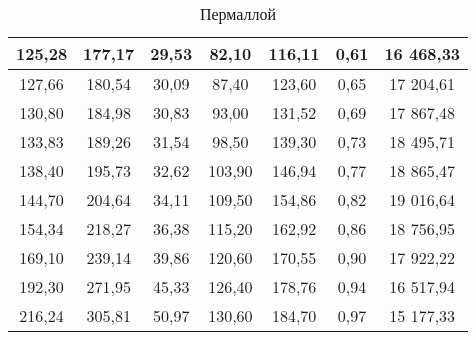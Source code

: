 \begin{table}[h!]
\begin{center}
\begin{tabular}{|c|c|c|c|c|c|c|}
            125,28               & 177,17    & 29,53     & 82,10                & 116,11   & 0,61    & 16 468,33  \\ \hline
            127,66               & 180,54    & 30,09     & 87,40                & 123,60   & 0,65    & 17 204,61  \\ \hline
            130,80               & 184,98    & 30,83     & 93,00                & 131,52   & 0,69    & 17 867,48  \\ \hline
            133,83               & 189,26    & 31,54     & 98,50                & 139,30   & 0,73    & 18 495,71  \\ \hline
            138,40               & 195,73    & 32,62     & 103,90               & 146,94   & 0,77    & 18 865,47  \\ \hline
            144,70               & 204,64    & 34,11     & 109,50               & 154,86   & 0,82    & 19 016,64  \\ \hline
            154,34               & 218,27    & 36,38     & 115,20               & 162,92   & 0,86    & 18 756,95  \\ \hline
            169,10               & 239,14    & 39,86     & 120,60               & 170,55   & 0,90    & 17 922,22  \\ \hline
            192,30               & 271,95    & 45,33     & 126,40               & 178,76   & 0,94    & 16 517,94  \\ \hline
            216,24               & 305,81    & 50,97     & 130,60               & 184,70   & 0,97    & 15 177,33  \\ \hline
            \end{tabular}
    \end{center}
    \caption{Пермаллой}
	\label{sample2_table}
\end{table}